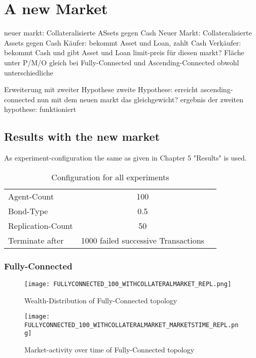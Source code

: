 \documentclass[Bachelorarbeit.tex]{subfiles}
\begin{document}
\graphicspath{{./figures/newMarket/}}	%

\chapter{A new Market}
neuer markt: Collateralisierte ASsets gegen Cash			
	Neuer Markt: Collateralisierte Assets gegen Cash
	Käufer: 		bekommt Asset und Loan, zahlt Cash
	Verkäufer: 		bekommt Cash und gibt Asset und Loan
	limit-preis für diesen markt?
	Fläche unter P/M/O gleich bei Fully-Connected und Ascending-Connected obwohl unterschiedliche

Erweiterung mit zweiter Hypothese
zweite Hypothese: erreicht ascending-connected nun mit dem neuen markt das gleichgewicht?
ergebnis der zweiten hypothese: funktioniert
		
\section{Results with the new market}	
As experiment-configuration the same as given in Chapter 5 "Results" is used.

\begin{table}[h]
	\centering
	\caption{Configuration for all experiments}
	\begin{tabular} { l c r }
		\hline
		Agent-Count & 100 \\
		Bond-Type & 0.5 \\
		Replication-Count & 50 \\
		Terminate after & 1000 failed successive Transactions \\
		\hline
	\end{tabular}
\end{table}

\subsection{Fully-Connected}
\begin{figure}[H]
	\centering
  \texttt{[image: FULLYCONNECTED\_100\_WITHCOLLATERALMARKET\_REPL.png]}
	\caption{Wealth-Distribution of Fully-Connected topology}
	\label{fig1}
\end{figure}

\begin{figure}[H]
	\centering
  \texttt{[image: FULLYCONNECTED\_100\_WITHCOLLATERALMARKET\_MARKETSTIME\_REPL.png]}
  	\caption{Market-activity over time of Fully-Connected topology}
	\label{fig1}
\end{figure}
\end{document}
